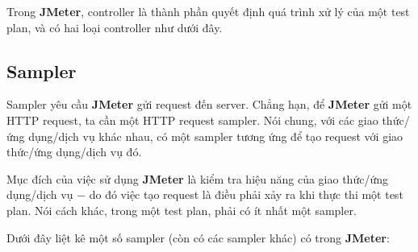 \documentclass[10pt]{report}
\newcommand{\jmeter}{\textbf{JMeter}}
\begin{document}
\par Trong \jmeter{}, controller là thành phần quyết định quá trình xử lý của một test plan, và có hai loại controller như dưới đây.

\subsection{Sampler}

\par Sampler yêu cầu \jmeter{} gửi request đến server. Chẳng hạn, để \jmeter{} gửi một HTTP request, ta cần một HTTP request sampler. Nói chung, với các giao thức/ứng dụng/dịch vụ khác nhau, có một sampler tương ứng để tạo request với giao thức/ứng dụng/dịch vụ đó.

\par Mục đích của việc sử dụng \jmeter{} là kiểm tra hiệu năng của giao thức/ứng dụng/dịch vụ $-$ do đó việc tạo request là điều phải xảy ra khi thực thi một test plan. Nói cách khác, trong một test plan, phải có ít nhất một sampler.

\par Dưới đây liệt kê một số sampler (còn có các sampler khác) có trong \jmeter{}:
\end{document}
